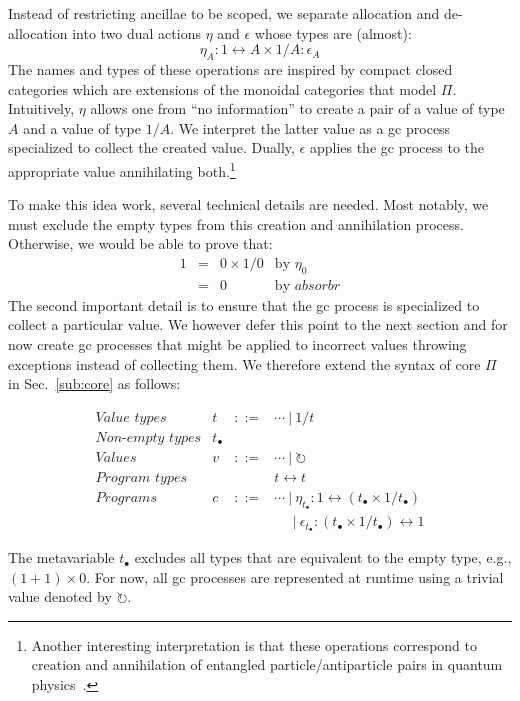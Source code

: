 \documentclass[sigplan,10pt,review,anonymous]{acmart}
\newcommand{\alt}{~|~}
\newcommand{\net}{t_\bullet}
\newcommand{\gcv}{\circlearrowright}
\newcommand{\oneover}[1]{1/#1}
\newcommand{\absorbr}{\mathit{absorbr}}
\begin{document}
Instead of restricting ancillae to be scoped, we separate allocation
and de-allocation into two dual actions $\eta$ and $\epsilon$ whose
types are (almost):
\[
\eta_A : 1 \leftrightarrow A \times \oneover{A} : \epsilon_A
\]
The names and types of these operations are inspired by compact closed
categories which are extensions of the monoidal categories that model
$\Pi$. Intuitively, $\eta$ allows one from ``no information'' to
create a pair of a value of type $A$ and a value of type
$\oneover{A}$. We interpret the latter value as a gc process
specialized to collect the created value. Dually, $\epsilon$ applies
the gc process to the appropriate value annihilating
both.\footnote{Another interesting interpretation is that these
  operations correspond to creation and annihilation of entangled
  particle/antiparticle pairs in quantum
  physics~\cite{Panangaden2011}.}

To make this idea work, several technical details are needed. Most
notably, we must exclude the empty types from this creation and
annihilation process. Otherwise, we would be able to prove that:
\[\begin{array}{rcll}
1 &=& 0 \times 1/0 & \textrm{by~} \eta_0 \\
&=& 0 & \textrm{by~} \absorbr
\end{array}\]
The second important detail is to ensure that the gc process is
specialized to collect a particular value. We however defer this point to
the next section and for now create gc processes that might be applied
to incorrect values throwing exceptions instead of collecting them. We
therefore extend the syntax of core $\Pi$ in Sec.~\ref{sub:core} as
follows:

\[\begin{array}{lrcl}
\textit{Value types} & t &::=& \cdots \alt \oneover{t} \\
\textit{Non-empty types} & \net \\
\textit{Values}      & v &::=& \cdots \alt \gcv \\
\textit{Program types} &&& t \leftrightarrow t \\
\textit{Programs} & c &::=& \cdots \alt
   \eta_{\net} : 1 \leftrightarrow (\net \times \oneover{\net}) \\
   &&& ~~~~~\alt \epsilon_{\net} : (\net \times \oneover{\net}) \leftrightarrow 1
\end{array}\]

The metavariable $\net$ excludes all types that are equivalent to the
empty type, e.g., $(1 + 1) \times 0$. For now, all gc processes are
represented at runtime using a trivial value denoted by $\gcv$.
\end{document}
